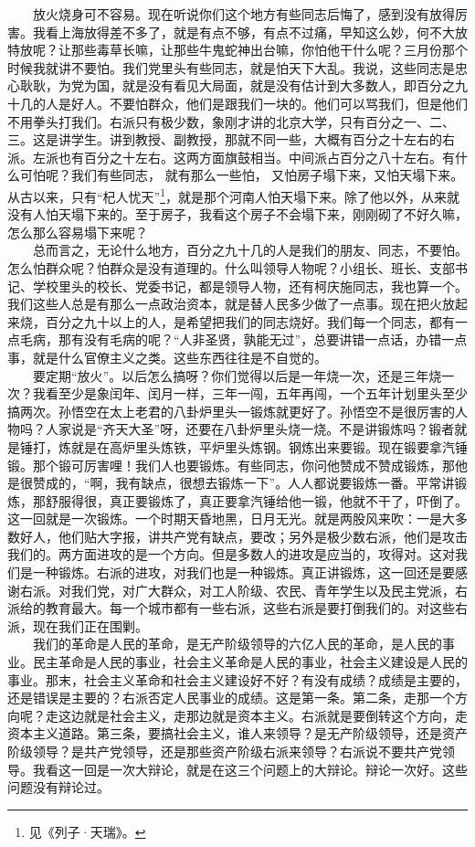 \documentclass[cn,11pt,chinese]{elegantbook}
\begin{document}
　　放火烧身可不容易。现在听说你们这个地方有些同志后悔了，感到没有放得厉害。我看上海放得差不多了，就是有点不够，有点不过痛，早知这么妙，何不大放特放呢？让那些毒草长嘛，让那些牛鬼蛇神出台嘛，你怕他干什么呢？三月份那个时候我就讲不要怕。我们党里头有些同志，就是怕天下大乱。我说，这些同志是忠心耿耿，为党为国，就是没有看见大局面，就是没有估计到大多数人，即百分之九十几的人是好人。不要怕群众，他们是跟我们一块的。他们可以骂我们，但是他们不用拳头打我们。右派只有极少数，象刚才讲的北京大学，只有百分之一、二、三。这是讲学生。讲到教授、副教授，那就不同一些，大概有百分之十左右的右派。左派也有百分之十左右。这两方面旗鼓相当。中间派占百分之八十左右。有什么可怕呢？我们有些同志， 就有那么一些怕， 又怕房子塌下来，又怕天塌下来。从古以来，只有“杞人忧天”\footnote[1]{ 见《列子·天瑞》。}，就是那个河南人怕天塌下来。除了他以外，从来就没有人怕天塌下来的。至于房子，我看这个房子不会塌下来，刚刚砌了不好久嘛，怎么那么容易塌下来呢？\\
　　总而言之，无论什么地方，百分之九十几的人是我们的朋友、同志，不要怕。怎么怕群众呢？怕群众是没有道理的。什么叫领导人物呢？小组长、班长、支部书记、学校里头的校长、党委书记，都是领导人物，还有柯庆施同志，我也算一个。我们这些人总是有那么一点政治资本，就是替人民多少做了一点事。现在把火放起来烧，百分之九十以上的人，是希望把我们的同志烧好。我们每一个同志，都有一点毛病，那有没有毛病的呢？“人非圣贤，孰能无过”，总要讲错一点话，办错一点事，就是什么官僚主义之类。这些东西往往是不自觉的。\\
　　要定期“放火”。以后怎么搞呀？你们觉得以后是一年烧一次，还是三年烧一次？我看至少是象闰年、闰月一样，三年一闯，五年再闯，一个五年计划里头至少搞两次。孙悟空在太上老君的八卦炉里头一锻炼就更好了。孙悟空不是很厉害的人物吗？人家说是“齐天大圣”呀，还要在八卦炉里头烧一烧。不是讲锻炼吗？锻者就是锤打，炼就是在高炉里头炼铁，平炉里头炼钢。钢炼出来要锻。现在锻要拿汽锤锻。那个锻可厉害哩！我们人也要锻炼。有些同志，你问他赞成不赞成锻炼，那他是很赞成的，“啊，我有缺点，很想去锻炼一下”。人人都说要锻炼一番。平常讲锻炼，那舒服得很，真正要锻炼了，真正要拿汽锤给他一锻，他就不干了，吓倒了。这一回就是一次锻炼。一个时期天昏地黑，日月无光。就是两股风来吹：一是大多数好人，他们贴大字报，讲共产党有缺点，要改；另外是极少数右派，他们是攻击我们的。两方面进攻的是一个方向。但是多数人的进攻是应当的，攻得对。这对我们是一种锻炼。右派的进攻，对我们也是一种锻炼。真正讲锻炼，这一回还是要感谢右派。对我们党，对广大群众，对工人阶级、农民、青年学生以及民主党派，右派给的教育最大。每一个城市都有一些右派，这些右派是要打倒我们的。对这些右派，现在我们正在围剿。\\
　　我们的革命是人民的革命，是无产阶级领导的六亿人民的革命，是人民的事业。民主革命是人民的事业，社会主义革命是人民的事业，社会主义建设是人民的事业。那末，社会主义革命和社会主义建设好不好？有没有成绩？成绩是主要的，还是错误是主要的？右派否定人民事业的成绩。这是第一条。第二条，走那一个方向呢？走这边就是社会主义，走那边就是资本主义。右派就是要倒转这个方向，走资本主义道路。第三条，要搞社会主义，谁人来领导？是无产阶级领导，还是资产阶级领导？是共产党领导，还是那些资产阶级右派来领导？右派说不要共产党领导。我看这一回是一次大辩论，就是在这三个问题上的大辩论。辩论一次好。这些问题没有辩论过。\\
\end{document}
